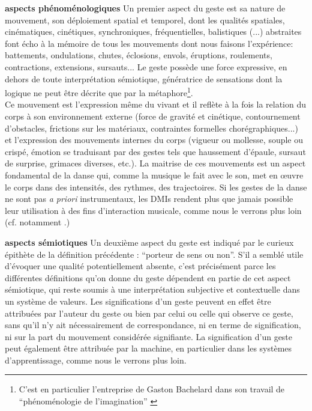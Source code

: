 \noindent \textbf{aspects phénoménologiques} Un premier aspect du geste est sa nature de mouvement, son déploiement spatial et temporel, dont les qualités spatiales, cinématiques, cinétiques, synchroniques, fréquentielles, balistiques (...) abstraites font écho à la mémoire de tous les mouvements dont nous faisons l'expérience: battements, ondulations, chutes, éclosions, envols, éruptions, roulements, contractions, extensions, sursauts... Le geste possède une force expressive, en dehors de toute interprétation sémiotique, génératrice de sensations dont la logique ne peut être décrite que par la métaphore\footnote{C'est en particulier l'entreprise de Gaston Bachelard dans son travail de ``phénoménologie de l'imagination'' \cite{bachelard_air_1943}}.\\
\indent Ce mouvement est l'expression même du vivant et il reflète à la fois la relation du corps à son environnement externe (force de gravité et cinétique, contournement d'obstacles, frictions sur les matériaux, contraintes formelles chorégraphiques...) et l'expression des mouvements internes du corps (vigueur ou mollesse, souple ou crispé, émotion se traduisant par des gestes tels que haussement d'épaule, sursaut de surprise, grimaces diverses, etc.). La maitrise de ces mouvements est un aspect fondamental de la danse qui, comme la musique le fait avec le son, met en œuvre le corps dans des intensités, des rythmes, des trajectoires. Si les gestes de la danse ne sont pas \textit{a priori} instrumentaux, les \glspl{DMI} rendent plus que jamais possible leur utilisation à des fins d'interaction musicale, comme nous le verrons plus loin (cf. notamment \cite{bevilacqua_gesture_2011, alaoui_movement_2012, silang_maranan_designing_2014, hsueh_understanding_2019}.)

\noindent \textbf{aspects sémiotiques} Un deuxième aspect du geste est indiqué par le curieux épithète de la définition précédente : ``porteur de sens ou non''. S'il a semblé utile d'évoquer une qualité potentiellement absente, c'est précisément parce les différentes définitions qu'on donne du geste dépendent en partie de cet aspect sémiotique, qui reste soumis à une interprétation subjective et contextuelle dans un système de valeurs. Les significations d'un geste peuvent en effet être attribuées par l'auteur du geste ou bien par celui ou celle qui observe ce geste, sans qu'il n'y ait nécessairement de correspondance, ni en terme de signification, ni sur la part du mouvement considérée signifiante. La signification d'un geste peut également être attribuée par la machine, en particulier dans les systèmes d'apprentissage, comme nous le verrons plus loin.

